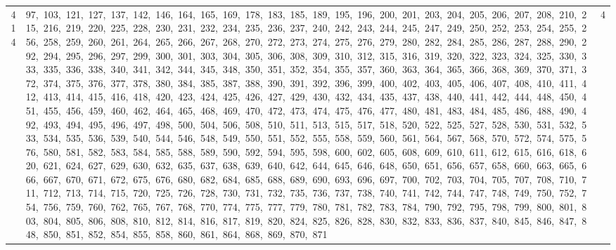 \begin{longtable}{c|p{}|r}
414 & 97,\ 103,\ 121,\ 127,\ 137,\ 142,\ 146,\ 164,\ 165,\ 169,\ 178,\ 183,\ 185,\ 189,\ 195,\ 196,\ 200,\ 201,\ 203,\ 204,\ 205,\ 206,\ 207,\ 208,\ 210,\ 215,\ 216,\ 219,\ 220,\ 225,\ 228,\ 230,\ 231,\ 232,\ 234,\ 235,\ 236,\ 237,\ 240,\ 242,\ 243,\ 244,\ 245,\ 247,\ 249,\ 250,\ 252,\ 253,\ 254,\ 255,\ 256,\ 258,\ 259,\ 260,\ 261,\ 264,\ 265,\ 266,\ 267,\ 268,\ 270,\ 272,\ 273,\ 274,\ 275,\ 276,\ 279,\ 280,\ 282,\ 284,\ 285,\ 286,\ 287,\ 288,\ 290,\ 292,\ 294,\ 295,\ 296,\ 297,\ 299,\ 300,\ 301,\ 303,\ 304,\ 305,\ 306,\ 308,\ 309,\ 310,\ 312,\ 315,\ 316,\ 319,\ 320,\ 322,\ 323,\ 324,\ 325,\ 330,\ 333,\ 335,\ 336,\ 338,\ 340,\ 341,\ 342,\ 344,\ 345,\ 348,\ 350,\ 351,\ 352,\ 354,\ 355,\ 357,\ 360,\ 363,\ 364,\ 365,\ 366,\ 368,\ 369,\ 370,\ 371,\ 372,\ 374,\ 375,\ 376,\ 377,\ 378,\ 380,\ 384,\ 385,\ 387,\ 388,\ 390,\ 391,\ 392,\ 396,\ 399,\ 400,\ 402,\ 403,\ 405,\ 406,\ 407,\ 408,\ 410,\ 411,\ 412,\ 413,\ 414,\ 415,\ 416,\ 418,\ 420,\ 423,\ 424,\ 425,\ 426,\ 427,\ 429,\ 430,\ 432,\ 434,\ 435,\ 437,\ 438,\ 440,\ 441,\ 442,\ 444,\ 448,\ 450,\ 451,\ 455,\ 456,\ 459,\ 460,\ 462,\ 464,\ 465,\ 468,\ 469,\ 470,\ 472,\ 473,\ 474,\ 475,\ 476,\ 477,\ 480,\ 481,\ 483,\ 484,\ 485,\ 486,\ 488,\ 490,\ 492,\ 493,\ 494,\ 495,\ 496,\ 497,\ 498,\ 500,\ 504,\ 506,\ 508,\ 510,\ 511,\ 513,\ 515,\ 517,\ 518,\ 520,\ 522,\ 525,\ 527,\ 528,\ 530,\ 531,\ 532,\ 533,\ 534,\ 535,\ 536,\ 539,\ 540,\ 544,\ 546,\ 548,\ 549,\ 550,\ 551,\ 552,\ 555,\ 558,\ 559,\ 560,\ 561,\ 564,\ 567,\ 568,\ 570,\ 572,\ 574,\ 575,\ 576,\ 580,\ 581,\ 582,\ 583,\ 584,\ 585,\ 588,\ 589,\ 590,\ 592,\ 594,\ 595,\ 598,\ 600,\ 602,\ 605,\ 608,\ 609,\ 610,\ 611,\ 612,\ 615,\ 616,\ 618,\ 620,\ 621,\ 624,\ 627,\ 629,\ 630,\ 632,\ 635,\ 637,\ 638,\ 639,\ 640,\ 642,\ 644,\ 645,\ 646,\ 648,\ 650,\ 651,\ 656,\ 657,\ 658,\ 660,\ 663,\ 665,\ 666,\ 667,\ 670,\ 671,\ 672,\ 675,\ 676,\ 680,\ 682,\ 684,\ 685,\ 688,\ 689,\ 690,\ 693,\ 696,\ 697,\ 700,\ 702,\ 703,\ 704,\ 705,\ 707,\ 708,\ 710,\ 711,\ 712,\ 713,\ 714,\ 715,\ 720,\ 725,\ 726,\ 728,\ 730,\ 731,\ 732,\ 735,\ 736,\ 737,\ 738,\ 740,\ 741,\ 742,\ 744,\ 747,\ 748,\ 749,\ 750,\ 752,\ 754,\ 756,\ 759,\ 760,\ 762,\ 765,\ 767,\ 768,\ 770,\ 774,\ 775,\ 777,\ 779,\ 780,\ 781,\ 782,\ 783,\ 784,\ 790,\ 792,\ 795,\ 798,\ 799,\ 800,\ 801,\ 803,\ 804,\ 805,\ 806,\ 808,\ 810,\ 812,\ 814,\ 816,\ 817,\ 819,\ 820,\ 824,\ 825,\ 826,\ 828,\ 830,\ 832,\ 833,\ 836,\ 837,\ 840,\ 845,\ 846,\ 847,\ 848,\ 850,\ 851,\ 852,\ 854,\ 855,\ 858,\ 860,\ 861,\ 864,\ 868,\ 869,\ 870,\ 871 & 4 \\

\end{longtable}
